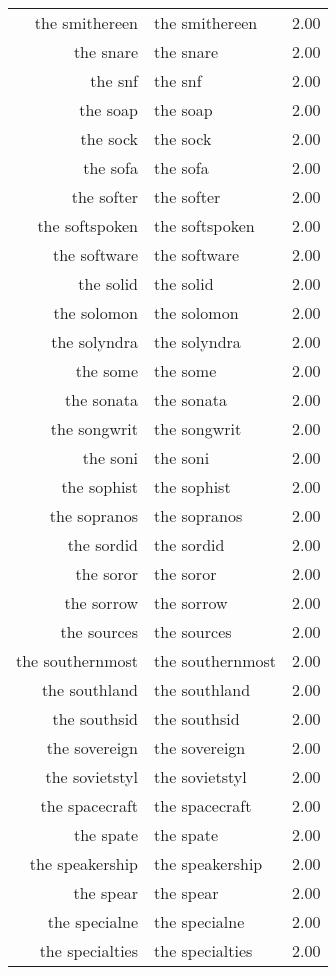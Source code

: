 \begin{table}[ht]
\begin{tabular}{rlr}
  the smithereen & the smithereen & 2.00 \\ 
  the snare & the snare & 2.00 \\ 
  the snf & the snf & 2.00 \\ 
  the soap & the soap & 2.00 \\ 
  the sock & the sock & 2.00 \\ 
  the sofa & the sofa & 2.00 \\ 
  the softer & the softer & 2.00 \\ 
  the softspoken & the softspoken & 2.00 \\ 
  the software & the software & 2.00 \\ 
  the solid & the solid & 2.00 \\ 
  the solomon & the solomon & 2.00 \\ 
  the solyndra & the solyndra & 2.00 \\ 
  the some & the some & 2.00 \\ 
  the sonata & the sonata & 2.00 \\ 
  the songwrit & the songwrit & 2.00 \\ 
  the soni & the soni & 2.00 \\ 
  the sophist & the sophist & 2.00 \\ 
  the sopranos & the sopranos & 2.00 \\ 
  the sordid & the sordid & 2.00 \\ 
  the soror & the soror & 2.00 \\ 
  the sorrow & the sorrow & 2.00 \\ 
  the sources & the sources & 2.00 \\ 
  the southernmost & the southernmost & 2.00 \\ 
  the southland & the southland & 2.00 \\ 
  the southsid & the southsid & 2.00 \\ 
  the sovereign & the sovereign & 2.00 \\ 
  the sovietstyl & the sovietstyl & 2.00 \\ 
  the spacecraft & the spacecraft & 2.00 \\ 
  the spate & the spate & 2.00 \\ 
  the speakership & the speakership & 2.00 \\ 
  the spear & the spear & 2.00 \\ 
  the specialne & the specialne & 2.00 \\ 
  the specialties & the specialties & 2.00 \\ 

\end{tabular}
\end{table}
